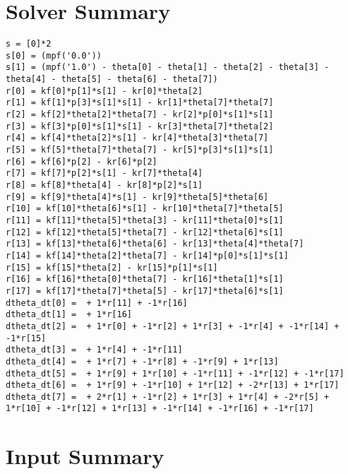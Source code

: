 \documentclass[a4paper,8pt]{report}
\begin{document}
\section{Solver Summary}
\begin{verbatim}s = [0]*2
s[0] = (mpf('0.0'))
s[1] = (mpf('1.0') - theta[0] - theta[1] - theta[2] - theta[3] - theta[4] - theta[5] - theta[6] - theta[7])
r[0] = kf[0]*p[1]*s[1] - kr[0]*theta[2]
r[1] = kf[1]*p[3]*s[1]*s[1] - kr[1]*theta[7]*theta[7]
r[2] = kf[2]*theta[2]*theta[7] - kr[2]*p[0]*s[1]*s[1]
r[3] = kf[3]*p[0]*s[1]*s[1] - kr[3]*theta[7]*theta[2]
r[4] = kf[4]*theta[2]*s[1] - kr[4]*theta[3]*theta[7]
r[5] = kf[5]*theta[7]*theta[7] - kr[5]*p[3]*s[1]*s[1]
r[6] = kf[6]*p[2] - kr[6]*p[2]
r[7] = kf[7]*p[2]*s[1] - kr[7]*theta[4]
r[8] = kf[8]*theta[4] - kr[8]*p[2]*s[1]
r[9] = kf[9]*theta[4]*s[1] - kr[9]*theta[5]*theta[6]
r[10] = kf[10]*theta[6]*s[1] - kr[10]*theta[7]*theta[5]
r[11] = kf[11]*theta[5]*theta[3] - kr[11]*theta[0]*s[1]
r[12] = kf[12]*theta[5]*theta[7] - kr[12]*theta[6]*s[1]
r[13] = kf[13]*theta[6]*theta[6] - kr[13]*theta[4]*theta[7]
r[14] = kf[14]*theta[2]*theta[7] - kr[14]*p[0]*s[1]*s[1]
r[15] = kf[15]*theta[2] - kr[15]*p[1]*s[1]
r[16] = kf[16]*theta[0]*theta[7] - kr[16]*theta[1]*s[1]
r[17] = kf[17]*theta[7]*theta[5] - kr[17]*theta[6]*s[1]
dtheta_dt[0] =  + 1*r[11] + -1*r[16]
dtheta_dt[1] =  + 1*r[16]
dtheta_dt[2] =  + 1*r[0] + -1*r[2] + 1*r[3] + -1*r[4] + -1*r[14] + -1*r[15]
dtheta_dt[3] =  + 1*r[4] + -1*r[11]
dtheta_dt[4] =  + 1*r[7] + -1*r[8] + -1*r[9] + 1*r[13]
dtheta_dt[5] =  + 1*r[9] + 1*r[10] + -1*r[11] + -1*r[12] + -1*r[17]
dtheta_dt[6] =  + 1*r[9] + -1*r[10] + 1*r[12] + -2*r[13] + 1*r[17]
dtheta_dt[7] =  + 2*r[1] + -1*r[2] + 1*r[3] + 1*r[4] + -2*r[5] + 1*r[10] + -1*r[12] + 1*r[13] + -1*r[14] + -1*r[16] + -1*r[17]
\end{verbatim}\section{Input Summary}
\end{document}
